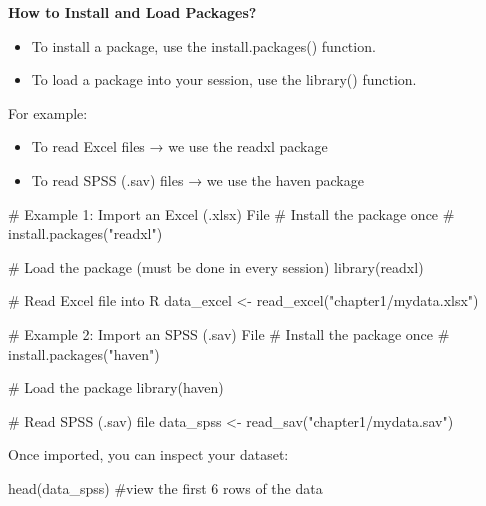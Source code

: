 \documentclass[
  letterpaper,
  DIV=11,
  numbers=noendperiod]{scrreprt}
\newenvironment{Shaded}{\begin{snugshade}}{\end{snugshade}}
\newcommand{\CommentTok}[1]{\textcolor[rgb]{0.37,0.37,0.37}{#1}}
\newcommand{\FunctionTok}[1]{\textcolor[rgb]{0.28,0.35,0.67}{#1}}
\newcommand{\NormalTok}[1]{\textcolor[rgb]{0.00,0.23,0.31}{#1}}
\newcommand{\OtherTok}[1]{\textcolor[rgb]{0.00,0.23,0.31}{#1}}
\newcommand{\StringTok}[1]{\textcolor[rgb]{0.13,0.47,0.30}{#1}}
\begin{document}
\textbf{How to Install and Load Packages?}

\begin{itemize}
\item
  To install a package, use the install.packages() function.
\item
  To load a package into your session, use the library() function.
\end{itemize}

For example:

\begin{itemize}
\item
  To read Excel files → we use the readxl package
\item
  To read SPSS (.sav) files → we use the haven package
\end{itemize}

\begin{Shaded}
\begin{Highlighting}[]
\CommentTok{\# Example 1: Import an Excel (.xlsx) File }
\CommentTok{\# Install the package once }
\CommentTok{\# install.packages("readxl") }
 
\CommentTok{\# Load the package (must be done in every session) }
\FunctionTok{library}\NormalTok{(readxl) }
 
\CommentTok{\# Read Excel file into R }
\NormalTok{data\_excel }\OtherTok{\textless{}{-}} \FunctionTok{read\_excel}\NormalTok{(}\StringTok{"chapter1/mydata.xlsx"}\NormalTok{) }
\end{Highlighting}
\end{Shaded}

\begin{Shaded}
\begin{Highlighting}[]
\CommentTok{\# Example 2: Import an SPSS (.sav) File }
\CommentTok{\# Install the package once }
\CommentTok{\# install.packages("haven") }
 
\CommentTok{\# Load the package }
\FunctionTok{library}\NormalTok{(haven) }
 
\CommentTok{\# Read SPSS (.sav) file }
\NormalTok{data\_spss }\OtherTok{\textless{}{-}} \FunctionTok{read\_sav}\NormalTok{(}\StringTok{"chapter1/mydata.sav"}\NormalTok{) }
\end{Highlighting}
\end{Shaded}

Once imported, you can inspect your dataset:

\begin{Shaded}
\begin{Highlighting}[]
\FunctionTok{head}\NormalTok{(data\_spss) }\CommentTok{\#view the first 6 rows of the data }
\end{Highlighting}
\end{Shaded}
\end{document}
